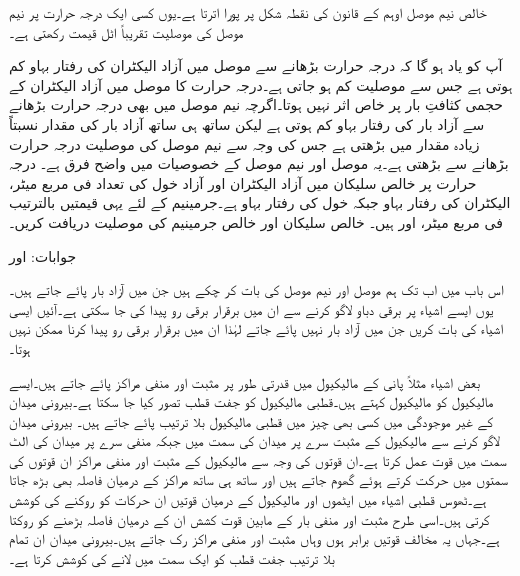 خالص نیم موصل اوہم کے قانون کی نقطہ شکل پر پورا اترتا ہے۔یوں کسی ایک درجہ حرارت پر نیم موصل کی موصلیت تقریباً اٹل قیمت رکھتی ہے۔  

آپ کو یاد ہو گا کہ درجہ حرارت بڑھانے سے موصل میں آزاد الیکٹران کی رفتار بہاو کم ہوتی ہے جس سے موصلیت کم  ہو جاتی ہے۔درجہ حرارت کا موصل میں آزاد الیکٹران کے حجمی کثافتِ بار پر خاص اثر نہیں ہوتا۔اگرچہ نیم موصل میں بھی درجہ حرارت بڑھانے سے آزاد بار کی رفتار بہاو کم ہوتی ہے لیکن ساتھ ہی ساتھ آزاد بار کی مقدار نسبتاً زیادہ مقدار میں بڑھتی ہے جس  کی وجہ سے نیم موصل کی  موصلیت درجہ حرارت بڑھانے سے بڑھتی ہے۔یہ موصل اور نیم موصل کے خصوصیات میں واضح فرق ہے۔
 درجہ حرارت پر خالص سلیکان میں آزاد الیکٹران اور آزاد خول کی تعداد  فی مربع میٹر، الیکٹران کی رفتار بہاو  جبکہ خول کی رفتار بہاو  ہے۔جرمینیم کے لئے یہی قیمتیں بالترتیب  فی مربع میٹر،  اور  ہیں۔ خالص سلیکان اور خالص جرمینیم کی موصلیت دریافت کریں۔

جوابات: اور 


اس باب میں اب تک ہم موصل اور نیم موصل کی بات کر چکے ہیں جن میں آزاد بار پائے جاتے ہیں۔یوں ایسے اشیاء پر برقی دباو لاگو کرنے سے ان میں برقرار برقی رو پیدا کی جا سکتی ہے۔آئیں ایسی اشیاء کی بات کریں جن میں آزاد بار نہیں پائے جاتے لہٰذا ان میں برقرار برقی رو پیدا کرنا ممکن نہیں ہوتا۔

بعض اشیاء مثلاً پانی  کے مالیکیول میں قدرتی طور پر مثبت اور منفی مراکز پائے جاتے  ہیں۔ایسے مالیکیول کو  مالیکیول کہتے ہیں۔قطبی مالیکیول کو جفت قطب تصور کیا جا سکتا ہے۔بیرونی میدان کے غیر موجودگی میں کسی بھی چیز میں قطبی مالیکیول بلا ترتیب پائے جاتے ہیں۔ بیرونی میدان  لاگو کرنے سے مالیکیول کے مثبت سرے پر میدان کی سمت میں جبکہ منفی سرے پر میدان کی الٹ سمت میں  قوت عمل کرتا ہے۔ان قوتوں کی وجہ سے مالیکیول کے مثبت اور منفی مراکز ان قوتوں کی سمتوں میں حرکت کرتے ہوئے گھوم جاتے ہیں اور ساتھ ہی ساتھ مراکز کے درمیان فاصلہ بھی بڑھ جاتا ہے۔ٹھوس قطبی اشیاء میں ایٹموں اور مالیکیول کے درمیان قوتیں ان حرکات کو روکنے کی کوشش کرتی ہیں۔اسی طرح مثبت اور منفی بار کے مابین قوت کشش ان کے درمیان فاصلہ بڑھنے کو روکتا ہے۔جہاں یہ مخالف قوتیں برابر ہوں وہاں مثبت اور منفی مراکز رک جاتے ہیں۔بیرونی میدان ان تمام بلا ترتیب جفت قطب کو ایک سمت میں لانے کی کوشش کرتا ہے۔

